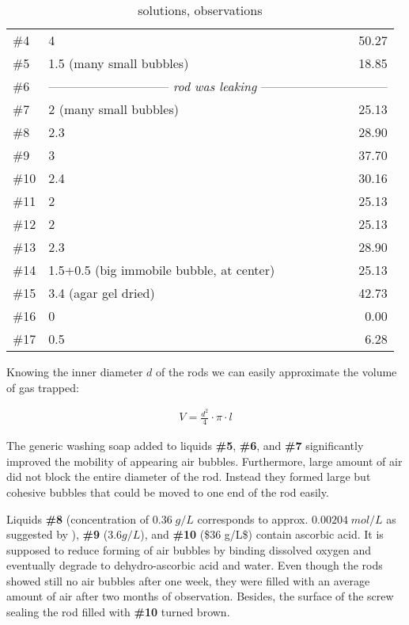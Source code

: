 \begin{table}[]
\begin{tabular}{l|lr}
\#4   & 4					& 50.27				\\
\#5   & 1.5 (many small bubbles)		& 18.85				\\
\#6   & \multicolumn{2}{c}{-----------------------------\textit{ rod was leaking }------------------------------}\\
\#7   & 2 (many small bubbles)			& 25.13				\\
\#8   & 2.3					& 28.90				\\
\#9   & 3					& 37.70				\\
\#10  & 2.4					& 30.16				\\
\#11  & 2					& 25.13				\\
\#12  & 2					& 25.13				\\
\#13  & 2.3					& 28.90				\\
\#14  & 1.5+0.5 (big immobile bubble, at center)	& 25.13				\\
\#15  & 3.4 (agar gel dried)			& 42.73				\\
\#16  & 0					& 0.00				\\
\#17  & 0.5					& 6.28				\\
\bottomrule
\end{tabular}
\caption{solutions, observations}
\label{tab:bubbles}
\end{table}

Knowing the inner diameter $d$ of the rods we can easily approximate the volume of gas trapped:

\begin{align}
 V = \frac{d^2}{4}\cdot \pi \cdot l
\end{align}

The generic washing soap added to liquids \textbf{\#5}, \textbf{\#6}, and \textbf{\#7} significantly improved the mobility of appearing air bubbles.
Furthermore, large amount of air did not block the entire diameter of the rod.
Instead they formed large but cohesive bubbles that could be moved to one end of the rod easily.

Liquids \textbf{\#8} (concentration of $0.36 \; g/L$ corresponds to approx. $0.00204 \; mol/L$ as suggested by \cite{Abtahi2008, Bodannes1979}), \textbf{\#9} ($3.6 g/L$), and \textbf{\#10} (\$36 g/L\$) contain ascorbic acid. It is supposed to reduce forming of air bubbles by binding dissolved oxygen and eventually degrade to dehydro-ascorbic acid and water.
Even though the rods showed still no air bubbles after one week, they were filled with an average amount of air after two months of observation.
Besides, the surface of the screw sealing the rod filled with \textbf{\#10} turned brown.

